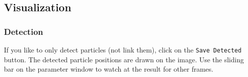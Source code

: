 \documentclass{scrartcl}
\begin{document}


\subsection{Visualization}
\label{sec:visualizing}
\subsubsection{Detection}
If you like to only detect particles (not link them), click on the \texttt{Save Detected} button. The detected particle positions are drawn on the image. Use the sliding bar on the parameter window to watch at the result for other frames.
\end{document}
